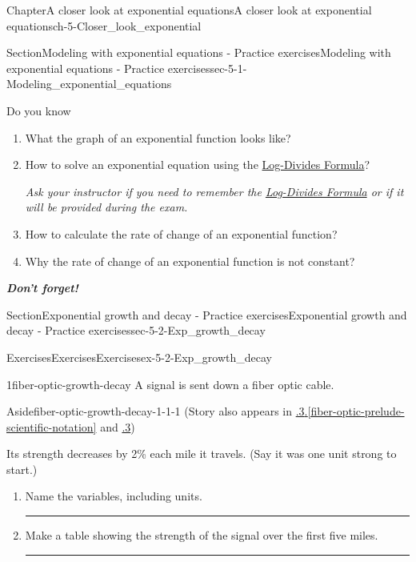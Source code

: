 \documentclass[twoside,11pt,]{book}
\newcommand{\xreffont}{\relax}
\newcommand{\alert}[1]{\textbf{\textit{#1}}}
\newlength{\workspacestrutwidth}
\numberwithin{equation}{section}
\begin{document}
\begin{chapterptx}{Chapter}{A closer look at exponential equations}{}{A closer look at exponential equations}{}{}{ch-5-Closer_look_exponential}
\begin{sectionptx}{Section}{Modeling with exponential equations - Practice exercises}{}{Modeling with exponential equations - Practice exercises}{}{}{sec-5-1-Modeling_exponential_equations}
\begin{conclusion}{Do you know \textellipsis{}}
\begin{enumerate}[label={\Alph*.}]
\item{}What the graph of an exponential function looks like?%
\item{}How to solve an exponential equation using the \hyperref[log-divides-formula]{Log-Divides Formula}?%
\par
\emph{Ask your instructor if you need to remember the \hyperref[log-divides-formula]{Log-Divides Formula} or if it will be provided during the exam.}%
\item{}How to calculate the rate of change of an exponential function?%
\item{}Why the rate of change of an exponential function is not constant?%
\end{enumerate}
%
\par
\alert{Don't forget!}%
\end{conclusion}%
\end{sectionptx}
%
%
\typeout{************************************************}
\typeout{************************************************}
%
\begin{sectionptx}{Section}{Exponential growth and decay - Practice exercises}{}{Exponential growth and decay - Practice exercises}{}{}{sec-5-2-Exp_growth_decay}
%
%
\typeout{************************************************}
\typeout{************************************************}
%
\begin{exercises-subsection-numberless}{Exercises}{Exercises}{}{Exercises}{}{}{ex-5-2-Exp_growth_decay}
\begin{divisionexercise}{1}{}{}{fiber-optic-growth-decay}%
A signal is sent down a fiber optic cable. \begin{aside}{Aside}{}{fiber-optic-growth-decay-1-1-1}%
(Story also appears in \hyperref[fiber-optic-prelude-scientific-notation]{{\xreffont 0.8.3}.{\xreffont\ref{fiber-optic-prelude-scientific-notation}}} and \hyperlink{fiber-optic-powers-roots}{{\xreffont 0.6.3}})%
\end{aside}
 Its strength decreases by 2\% each mile it travels. (Say it was one unit strong to start.)%
\begin{enumerate}[label=(\alph*),ref=\alph*]%
\item{}Name the variables, including units.%
\par\rule{\workspacestrutwidth}{1in}%
\item{}Make a table showing the strength of the signal over the first five miles.%
\par\rule{\workspacestrutwidth}{1.75in}%

\end{enumerate}
\end{divisionexercise}
\end{exercises-subsection-numberless}
\end{sectionptx}
\end{chapterptx}
\end{document}
